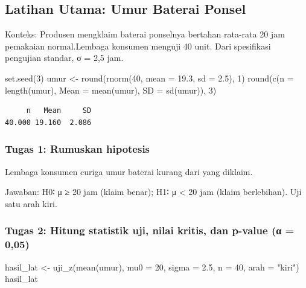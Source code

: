 \documentclass[
  indonesian,
  letterpaper,
]{book}
\newenvironment{Shaded}{\begin{snugshade}}{\end{snugshade}}
\newcommand{\AttributeTok}[1]{\textcolor[rgb]{0.40,0.45,0.13}{#1}}
\newcommand{\DecValTok}[1]{\textcolor[rgb]{0.68,0.00,0.00}{#1}}
\newcommand{\FloatTok}[1]{\textcolor[rgb]{0.68,0.00,0.00}{#1}}
\newcommand{\FunctionTok}[1]{\textcolor[rgb]{0.28,0.35,0.67}{#1}}
\newcommand{\NormalTok}[1]{\textcolor[rgb]{0.00,0.23,0.31}{#1}}
\newcommand{\OtherTok}[1]{\textcolor[rgb]{0.00,0.23,0.31}{#1}}
\newcommand{\StringTok}[1]{\textcolor[rgb]{0.13,0.47,0.30}{#1}}
\begin{document}
\subsection{Latihan Utama: Umur Baterai
Ponsel}\label{latihan-utama-umur-baterai-ponsel}

Konteks: Produsen mengklaim baterai ponselnya bertahan rata-rata 20 jam
pemakaian normal.Lembaga konsumen menguji 40 unit. Dari spesifikasi
pengujian standar, σ = 2,5 jam.

\begin{Shaded}
\begin{Highlighting}[]
\FunctionTok{set.seed}\NormalTok{(}\DecValTok{3}\NormalTok{)}
\NormalTok{umur }\OtherTok{\textless{}{-}} \FunctionTok{round}\NormalTok{(}\FunctionTok{rnorm}\NormalTok{(}\DecValTok{40}\NormalTok{, }\AttributeTok{mean =} \FloatTok{19.3}\NormalTok{, }\AttributeTok{sd =} \FloatTok{2.5}\NormalTok{), }\DecValTok{1}\NormalTok{)}
\FunctionTok{round}\NormalTok{(}\FunctionTok{c}\NormalTok{(}\AttributeTok{n =} \FunctionTok{length}\NormalTok{(umur), }\AttributeTok{Mean =} \FunctionTok{mean}\NormalTok{(umur), }\AttributeTok{SD =} \FunctionTok{sd}\NormalTok{(umur)), }\DecValTok{3}\NormalTok{)}
\end{Highlighting}
\end{Shaded}

\begin{verbatim}
     n   Mean     SD 
40.000 19.160  2.086 
\end{verbatim}

\subsubsection{Tugas 1: Rumuskan
hipotesis}\label{tugas-1-rumuskan-hipotesis}

Lembaga konsumen curiga umur baterai kurang dari yang diklaim.

Jawaban: H0∶ μ ≥ 20 jam (klaim benar); H1∶ μ \textless{} 20 jam (klaim
berlebihan). Uji satu arah kiri.

\subsubsection{Tugas 2: Hitung statistik uji, nilai kritis, dan p-value
(α =
0,05)}\label{tugas-2-hitung-statistik-uji-nilai-kritis-dan-p-value-ux3b1-005}

\begin{Shaded}
\begin{Highlighting}[]
\NormalTok{hasil\_lat }\OtherTok{\textless{}{-}} \FunctionTok{uji\_z}\NormalTok{(}\FunctionTok{mean}\NormalTok{(umur), }\AttributeTok{mu0 =} \DecValTok{20}\NormalTok{, }\AttributeTok{sigma =} \FloatTok{2.5}\NormalTok{, }\AttributeTok{n =} \DecValTok{40}\NormalTok{, }\AttributeTok{arah =} \StringTok{"kiri"}\NormalTok{)}
\NormalTok{hasil\_lat}
\end{Highlighting}
\end{Shaded}
\end{document}
